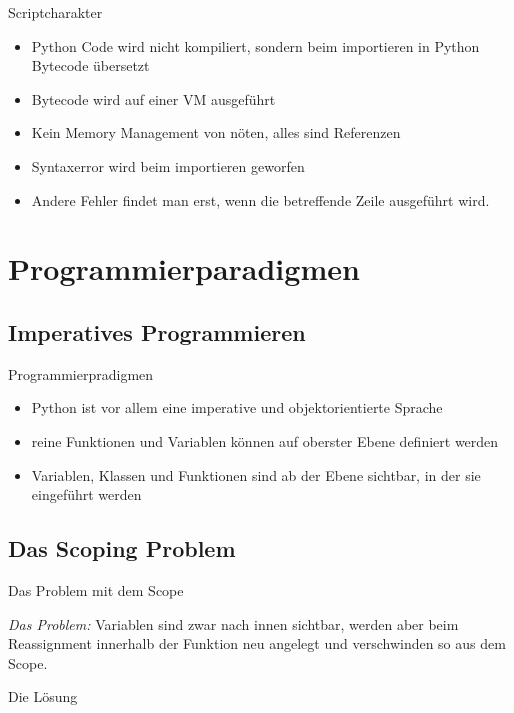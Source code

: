\begin{frame}{Scriptcharakter}
	\begin{itemize}
		\item Python Code wird nicht kompiliert, sondern beim importieren in Python Bytecode übersetzt
		\item Bytecode wird auf einer VM ausgeführt
		\item Kein Memory Management von nöten, alles sind Referenzen
		\item Syntaxerror wird beim importieren geworfen
		\item Andere Fehler findet man erst, wenn die betreffende Zeile ausgeführt wird.
	\end{itemize}
\end{frame}



\section{Programmierparadigmen}
\subsection{Imperatives Programmieren}
\begin{frame}[fragile]{Programmierpradigmen}
	\begin{itemize}
		\item Python ist vor allem eine imperative und objektorientierte Sprache
		\item reine Funktionen und Variablen können auf oberster Ebene definiert werden
		\item Variablen, Klassen und Funktionen sind ab der Ebene sichtbar, in der sie eingeführt werden
	\end{itemize}
\end{frame}

\subsection{Das Scoping Problem}
\begin{frame}[fragile]{Das Problem mit dem Scope}
	
	\textit{Das Problem:} Variablen sind zwar nach innen sichtbar, werden aber beim Reassignment innerhalb der Funktion neu angelegt und verschwinden so aus dem Scope.
\end{frame}

\begin{frame}[fragile]{Die Lösung}
	
\end{frame}

